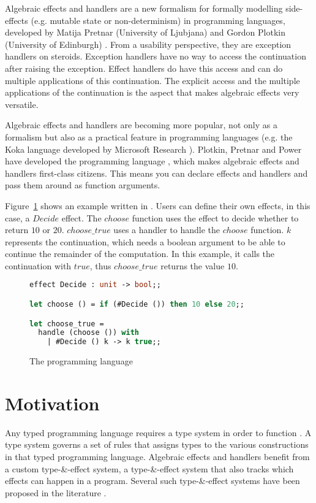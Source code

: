 Algebraic effects and handlers are a new formalism for formally modelling side-effects (e.g. mutable state or non-determinism) in programming languages, developed by Matija Pretnar (University of Ljubjana) and Gordon Plotkin (University of Edinburgh) \cite{DBLP:conf/lics/PlotkinP08,handling}. From a usability perspective, they are exception handlers on steroids. Exception handlers have no way to access the continuation after raising the exception. Effect handlers do have this access and can do multiple applications of this continuation. The explicit access and the multiple applications of the continuation is the aspect that makes algebraic effects very versatile.

Algebraic effects and handlers are becoming more popular, not only as a formalism but also as a practical feature in  programming languages (e.g. the Koka language developed by Microsoft Research \cite{leijen2014koka}). Plotkin, Pretnar and Power have developed the programming language \eff \cite{DBLP:journals/acs/PlotkinP03, DBLP:conf/lics/PlotkinP08}, which makes algebraic effects and handlers first-class citizens. This means you can declare effects and handlers and pass them around as function arguments. 

Figure~\ref{lst:introduction} shows an example written in \eff. Users can define their own effects, in this case, a $Decide$ effect. The $choose$ function uses the effect to decide whether to return $10$ or $20$. $choose\_true$ uses a handler to handle the $choose$ function. $k$ represents the continuation, which needs a boolean argument to be able to continue the remainder of the computation. In this example, it calls the continuation with $true$, thus $choose\_true$ returns the value $10$.

\begin{figure}
\caption{The \eff programming language}
\label{lst:introduction}
\begin{lstlisting}[language=Caml]
effect Decide : unit -> bool;;

let choose () = if (#Decide ()) then 10 else 20;;

let choose_true = 
  handle (choose ()) with 
    | #Decide () k -> k true;;
\end{lstlisting}
\end{figure} 

\section{Motivation}
Any typed programming language requires a type system in order to function \cite[Section~1.1]{pierce2002types}. A type system governs a set of rules that assigns types to the various constructions in that typed programming language. Algebraic effects and handlers benefit from a custom type-\&-effect system, a type-\&-effect system that also tracks which effects can happen in a program. Several such type-\&-effect systems have been proposed in the literature \cite{leijen2014koka,handling,effectsystem}. 

